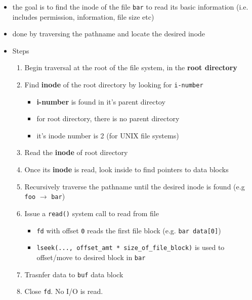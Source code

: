 \documentclass[12pt]{article}
\begin{document}
\begin{itemize}
    \item the goal is to find the inode of the file \texttt{bar} to read its basic information
    (i.e. includes permission, information, file size etc)
    \item done by traversing the pathname and locate the desired inode
    \item Steps

    \begin{enumerate}[1.]
        \item Begin traversal at the root of the file system, in the \textbf{root directory}

        \item Find \textbf{inode} of the root directory by looking for \texttt{i-number}

        \begin{itemize}
            \item \textbf{i-number} is found in it's parent directoy
            \item for root directory, there is no parent directory
            \item it's inode number is 2 (for UNIX file systems)
        \end{itemize}

        \item Read the \textbf{inode} of root directory
        \item Once its \textbf{inode} is read, look inside to find pointers
        to data blocks
        \item Recursively traverse the pathname until the desired inode is found (e.g \texttt{foo} $\to$ \texttt{bar})
        \item Issue a \texttt{read()} system call to read from file

        \begin{itemize}
            \item \texttt{fd} with offset \texttt{0} reads the first file block (e.g. \texttt{bar data[0]})
            \item \texttt{lseek(..., offset\_amt * size\_of\_file\_block)} is used to offset/move to desired block in \texttt{bar}
        \end{itemize}

        \item Trasnfer data to \texttt{buf} data block

        \item Close \texttt{fd}. No I/O is read.
    \end{enumerate}
\end{itemize}
\end{document}
